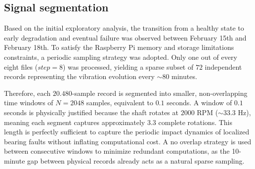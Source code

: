 \documentclass{article}
\begin{document}
\subsection{Signal segmentation}
Based on the initial exploratory analysis, the transition from a healthy state to early degradation and eventual failure was observed between February 15th and February 18th. To satisfy the Raspberry Pi memory and storage limitations constraints, a periodic sampling strategy was adopted. Only one out of every eight files ($step = 8$) was processed, yielding a sparse subset of $72$ independent records representing the vibration evolution every $\sim 80$ minutes.



Therefore, each $20.480$-sample record is segmented into smaller, non-overlapping time windows of $N = 2048$ samples, equivalent to $0.1$ seconds. A window of $0.1$ seconds is physically justified because the shaft rotates at $2000 \text{ RPM}$ ($\sim 33.3 \text{ Hz}$), meaning each segment captures approximately $3.3$ complete rotations. This length is perfectly sufficient to capture the periodic impact dynamics of localized bearing faults without inflating computational cost. A no overlap strategy is used between consecutive windows to minimize redundant computations, as the 10-minute gap between physical records already acts as a natural sparse sampling.
\end{document}

